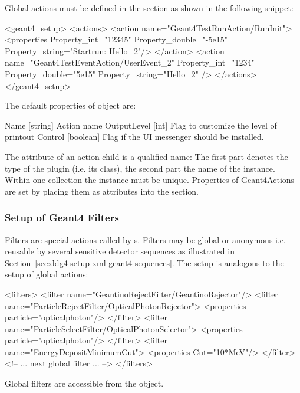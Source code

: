 \noindent
Global actions must be defined in the  section as shown in the following snippet:
\begin{code}
<geant4_setup>
  <actions>
    <action name="Geant4TestRunAction/RunInit">
      <properties Property_int="12345"
          Property_double="-5e15"
          Property_string="Startrun: Hello_2"/>
     </action>
    <action name="Geant4TestEventAction/UserEvent_2"
            Property_int="1234"
            Property_double="5e15"
            Property_string="Hello_2" />
  </actions>
</geant4_setup>
\end{code}
The default properties of   object are:
\begin{unnumberedcode}
Name        [string]                Action name
OutputLevel [int]                   Flag to customize the level of printout
Control     [boolean]               Flag if the UI messenger should be installed.
\end{unnumberedcode}
The  attribute of an action child is a qualified name: The first part
denotes the type of the plugin (i.e. its class), the second part the name of the instance.
Within one collection the instance  must be unique.
Properties of Geant4Actions are set by placing them as attributes into the
 section.

\subsubsection{Setup of Geant4 Filters}
\label{sec:ddg4-setup-xml-geant4-filters}
\noindent
Filters are special actions called by s. 
Filters may be global or anonymous i.e. reusable by several sensitive detector
sequences as illustrated in Section~\ref{sec:ddg4-setup-xml-geant4-sequences}. 
The setup is analogous to the setup of global actions:
\begin{code}
  <filters>
    <filter name="GeantinoRejectFilter/GeantinoRejector"/>
    <filter name="ParticleRejectFilter/OpticalPhotonRejector">
      <properties particle="opticalphoton"/>
    </filter>
    <filter name="ParticleSelectFilter/OpticalPhotonSelector">
      <properties particle="opticalphoton"/>
    </filter>
    <filter name="EnergyDepositMinimumCut">
      <properties Cut="10*MeV"/>
    </filter>
    <!--        ... next global filter ...       -->
  </filters>
\end{code}
Global filters are accessible from the  object.

